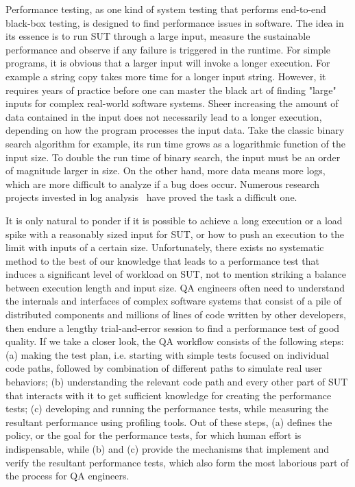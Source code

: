 Performance testing, as one kind of system testing that performs end-to-end black-box testing, is designed to find performance issues in software.
The idea in its essence is to run SUT through a large input, measure the sustainable performance and observe if any failure is triggered in the runtime.
For simple programs, it is obvious that a larger input will invoke a longer execution.
For example a string copy takes more time for a longer input string.
However, it requires years of practice before one can master the black art of finding "large" inputs for complex real-world software systems.
Sheer increasing the amount of data contained in the input does not necessarily lead to a longer execution, depending on how the program processes the input data.
Take the classic binary search algorithm for example, its run time grows as a logarithmic function of the input size.
To double the run time of binary search, the input must be an order of magnitude larger in size.
On the other hand, more data means more logs, which are more difficult to analyze if a bug does occur.
Numerous research projects invested in log analysis~\cite{oliner-cacm12} have proved the task a difficult one.


It is only natural to ponder if it is possible to achieve a long execution or a load spike with a reasonably sized input for SUT, or how to push an execution to the limit with inputs of a certain size.
Unfortunately, there exists no systematic method to the best of our knowledge that leads to a performance test that induces a significant level of workload on SUT, not to mention striking a balance between execution length and input size.
QA engineers often need to understand the internals and interfaces of complex software systems that consist of a pile of distributed components and millions of lines of code written by other developers, then endure a lengthy trial-and-error session to find a performance test of good quality.
If we take a closer look, the QA workflow consists of the following steps:
(a) making the test plan, i.e. starting with simple tests focused on individual code paths, followed by combination of different paths to simulate real user behaviors;
(b) understanding the relevant code path and every other part of SUT that interacts with it to get sufficient knowledge for creating the performance tests;
(c) developing and running the performance tests, while measuring the resultant performance using profiling tools.
Out of these steps, (a) defines the policy, or the goal for the performance tests, for which human effort is indispensable, while (b) and (c) provide the mechanisms that implement and verify the resultant performance tests, which also form the most laborious part of the process for QA engineers.

